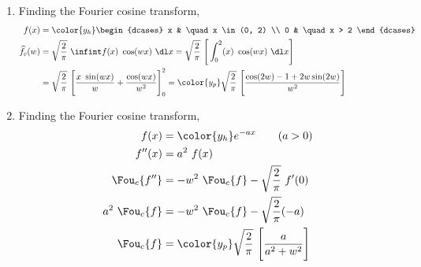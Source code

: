 \begin{enumerate}
    \item Finding the Fourier cosine transform,
          \begin{align}
              f(x)             & = \color{y_h} \begin{dcases}
                                                   x & \quad x \in (0, 2) \\
                                                   0 & \quad x > 2
                                               \end{dcases}                  \\
              \widehat{f}_c(w) & = \sqrt{\frac{2}{\pi}}\ \infint f(x)\ \cos(wx)\ \dl x
              = \sqrt{\frac{2}{\pi}}\ \Bigg[\int_{0}^{2} (x)
              \ \cos(wx)\ \dl x\Bigg]                                                  \\
                               & = \sqrt{\frac{2}{\pi}}\ \Bigg[ \frac{x\ \sin(wx)}{w}
                  + \frac{\cos(wx)}{w^2} \Bigg]_0^2
              = \color{y_p} \sqrt{\frac{2}{\pi}}\ \Bigg[\frac{\cos(2w) - 1
                      + 2w\sin(2w)}{w^2}\Bigg]
          \end{align}

    \item Finding the Fourier cosine transform,
          \begin{align}
              f(x)              & = \color{y_h} e^{-ax} \qquad (a>0)                 \\
              f''(x)            & = a^2\ f(x)                                        \\
              \Fou_c\{f''\}     & = -w^2\ \Fou_c\{f\} - \sqrt{\frac{2}{\pi}}\ f'(0)  \\
              a^2\ \Fou_c \{f\} & = -w^2\ \Fou_c \{f\} - \sqrt{\frac{2}{\pi}} (-a)   \\
              \Fou_c\{f\}       & = \color{y_p} \sqrt{\frac{2}{\pi}}\ \Bigg[\frac{a}
                  {a^2 + w^2}\Bigg]
          \end{align}


\end{enumerate}
